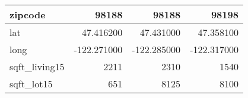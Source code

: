\begin{table}[H]
\begin{tabular}{|l|r|r|r|}
\hline zipcode & \cellcolor[rgb]{0.9, 0.54, 0.52} 98188 & \cellcolor[rgb]{0.9, 0.54, 0.52} 98188 & 98198 \\
\hline lat & \cellcolor[rgb]{0.9, 0.54, 0.52} 47.416200 & 47.431000 & 47.358100 \\
\hline long & \cellcolor[rgb]{0.9, 0.54, 0.52} -122.271000 & \cellcolor[rgb]{0.9, 0.54, 0.52} -122.285000 & \cellcolor[rgb]{0.9, 0.54, 0.52} -122.317000 \\
\hline sqft\_living15 & \cellcolor[rgb]{0.9, 0.54, 0.52} 2211 & 2310 & 1540 \\
\hline sqft\_lot15 & \cellcolor[rgb]{0.9, 0.54, 0.52} 651 & 8125 & 8100 \\
\hline
\end{tabular}
\end{table}
